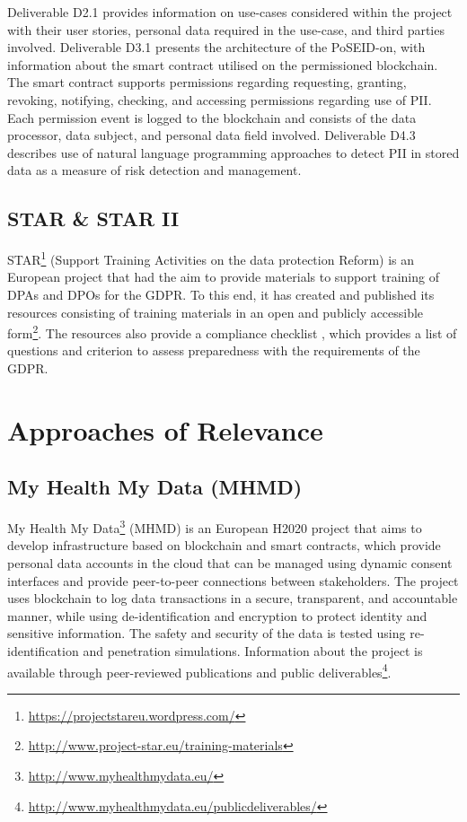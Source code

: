 Deliverable D2.1 \cite{noauthor_poseid-on_d2.1-use-cases-analysis-and-user-scenarios-v1.00.pdf_nodate} provides information on use-cases considered within the project with their user stories, personal data required in the use-case, and third parties involved. Deliverable D3.1 \cite{noauthor_d3.1_final-version_poseidon_v10.pdf_nodate} presents the architecture of the PoSEID-on, with information about the smart contract utilised on the permissioned blockchain. The smart contract supports permissions regarding requesting, granting, revoking, notifying, checking, and accessing permissions regarding use of PII. Each permission event is logged to the blockchain and consists of the data processor, data subject, and personal data field involved. Deliverable D4.3 \cite{noauthor_d4.3-rmm-and-pda-v1.0-final.pdf_nodate} describes use of natural language programming approaches to detect PII in stored data as a measure of risk detection and management.

\subsection{STAR \& STAR II}
STAR\footnote{\url{https://projectstareu.wordpress.com/}} (Support Training Activities on the data protection Reform) is an European project that had the aim to provide materials to support training of DPAs and DPOs for the GDPR. To this end, it has created and published its resources consisting of training materials in an open and publicly accessible form\footnote{\url{http://www.project-star.eu/training-materials}}. The resources also provide a compliance checklist \cite{noauthor_gdpr_2019-1}, which provides a list of questions and criterion to assess preparedness with the requirements of the GDPR. 

\section{Approaches of Relevance}\label{sec:sota:other}
\subsection{My Health My Data (MHMD)}
My Health My Data\footnote{\url{http://www.myhealthmydata.eu/}} (MHMD) is an European H2020 project that aims to develop infrastructure based on blockchain and smart contracts, which provide personal data accounts in the cloud that can be managed using dynamic consent interfaces and provide peer-to-peer connections between stakeholders. The project uses blockchain to log data transactions in a secure, transparent, and accountable manner, while using de-identification and encryption to protect identity and sensitive information. The safety and security of the data is tested using re-identification and penetration simulations.
Information about the project is available through peer-reviewed publications and public deliverables\footnote{\url{http://www.myhealthmydata.eu/publicdeliverables/}}.

